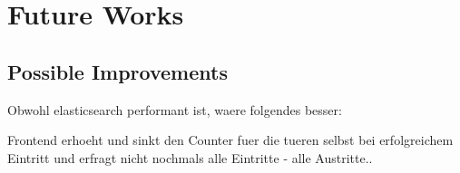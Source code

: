 \section{Future Works}

\subsection{Possible Improvements}

Obwohl elasticsearch performant ist, waere folgendes besser:

Frontend erhoeht und sinkt den Counter fuer die tueren selbst bei erfolgreichem Eintritt und erfragt nicht nochmals alle Eintritte - alle Austritte..

